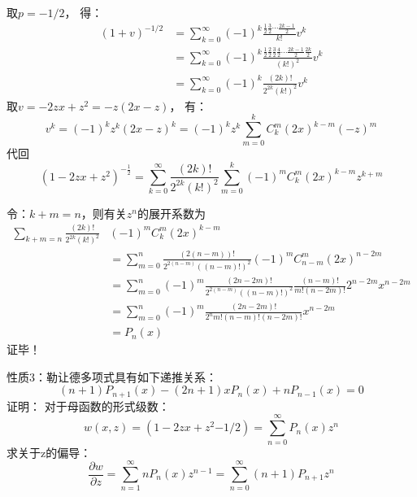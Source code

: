 \begin{frame}
	取$p=-1/2$， 得：
	\begin{align*}
		(1+v)^{-1/2}&=\sum_{k=0}^{\infty} (-1)^{k}\frac{\frac{1}{2}\frac{3}{2}  \cdots \frac{2k-1}{2}}{k !} v^{k}\\
		&=\sum_{k=0}^{\infty} (-1)^{k}\frac{\frac{1}{2}\frac{2}{2}\frac{3}{2} \frac{4}{2}  \cdots \frac{2k-1}{2}\frac{2k}{2}} {(k !)^2} v^{k}\\
		&=\sum_{k=0}^{\infty}(-1)^{k} \frac{(2 k) !}{2^{2 k}(k !)^{2}} v^{k}
	\end{align*}	
	取$v=-2zx+z^2=-z(2x-z)$， 有：
	\begin{equation*}
		v^{k}=(-1)^{k} z^{k}(2 x-z)^{k}=(-1)^{k} z^{k} \sum_{m=0}^{k} C_{k}^{m}(2 x)^{k-m}(-z)^{m}
	\end{equation*}	
	代回
	\begin{equation*}
		\left(1-2 z x+z^{2}\right)^{-\frac{1}{2}}=\sum_{k=0}^{\infty} \frac{(2 k) !}{2^{2 k}(k !)^{2}} \sum_{m=0}^{k}(-1)^{m} C_{k}^{m}(2 x)^{k-m} z^{k+m}
	\end{equation*}	
\end{frame}	

\begin{frame}
	令：$k+m=n$，则有关$z^{n}$的展开系数为
	\begin{equation*}
	\begin{split}
		\sum_{k+m=n}\frac{(2 k) !}{2^{2 k}(k !)^{2}} & (-1)^{m} C_{k}^{m}(2 x)^{k-m}\\
		&=\sum_{m=0}^{n} \frac{(2 (n-m)) !}{2^{2 (n-m)}((n-m) !)^{2}}(-1)^{m} C_{n-m}^{m}(2 x)^{n-2m}\\
		&=\sum_{m=0}^{n}(-1)^{m} \frac{(2 n-2m) !}{2^{2 (n-m)}((n-m) !)^{2}} \frac{(n-m) !}{m!(n-2 m) !}2^{n-2 m}x^{n-2 m}\\
		&=\sum_{m=0}^{n}(-1)^{m} \frac{(2 n-2 m) !}{2^{n} m !(n-m) !(n-2 m) !} x^{n-2 m} \\
		&=P_{n}(x)
	\end{split}
	\end{equation*}	
	\alert{证毕！}
\end{frame}	

\begin{frame}
	\alert{性质3：}勒让德多项式具有如下递推关系：
	\begin{equation*}
		(n+1) P_{n+1}(x)-(2 n+1) x P_{n}(x)+n P_{n-1}(x)=0
	\end{equation*}	
	\alert{证明：} 对于母函数的形式级数：
	\begin{equation*}
		w(x, z)=(1-2zx+z^2{-1/2})=\sum_{n=0}^{\infty} P_{n}(x) z^{n}
	\end{equation*}	
	求关于z的偏导：
	\begin{equation*}
		\frac{\partial w}{\partial z}=\sum_{n=1}^{\infty} n P_{n}(x) z^{n-1}=\sum_{n=0}^{\infty}(n+1) P_{n+1} z^{n}
	\end{equation*}		
\end{frame}	


